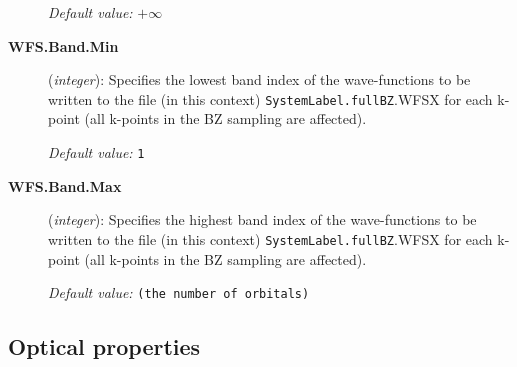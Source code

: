 \begin{description}
\textit{Default value:} $+\infty$

\item[\textbf{WFS.Band.Min}] (\textit{integer}):
Specifies the lowest band index of the wave-functions to be written to 
the file (in this context) \texttt{SystemLabel.fullBZ}.WFSX for each k-point (all k-points
in the BZ sampling are affected). 

\textit{Default value:} \texttt{1}

\item[\textbf{WFS.Band.Max}] (\textit{integer}):
Specifies the highest band index of the wave-functions to be written to 
the file (in this context) \texttt{SystemLabel.fullBZ}.WFSX for each k-point (all k-points
in the BZ sampling are affected).

\textit{Default value:} \texttt{(the number of orbitals)}

\end{description}


\vspace{5pt}
\subsection{Optical properties}

